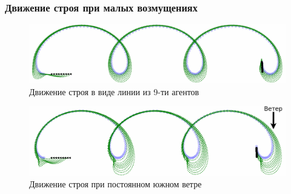 \documentclass[10pt]{beamer}
\begin{document}
\begin{frame}
	\frametitle{Движение строя при малых возмущениях}
	\begin{figure}
		\centering
		\includegraphics[width=0.9\linewidth]{platoon/line-platoon-cropped}
		\caption{Движение строя в виде линии из 9-ти агентов}
		\label{fig:line-platoon-cropped}
	\end{figure}
	\begin{figure}
		\centering
		\includegraphics[width=0.9\linewidth]{platoon/line-platoon-winded-cropped-txt}
		\caption{Движение строя при постоянном южном ветре}
		\label{fig:line-platoon-winded-cropped-txt}
	\end{figure}
\end{frame}
\end{document}
